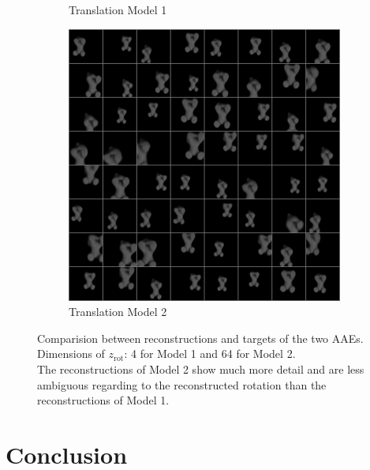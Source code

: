 \documentclass[10pt,a4paper]{article}
\newcommand{\rot}{\ensuremath{\text{rot}\xspace}}
\begin{document}
\begin{figure}[!ht]
\begin{subfigure}{0.3\textwidth}
	\caption{Translation Model 1}
	\label{cat_trec}
\end{subfigure}
\begin{subfigure}{0.3\textwidth}
	\centering	
	\includegraphics[width=\textwidth]{cat_64_output1.png}
	\caption{Translation Model 2}
	\label{cat_trec1}
\end{subfigure}
\caption{Comparision between reconstructions and targets of the two AAEs. 
Dimensions of $z_{\rot}$: 4 for Model 1 and 64 for Model 2.\\
The reconstructions of Model 2 show much more detail and are less ambiguous regarding to the reconstructed rotation than the reconstructions of Model 1.} \label{cat_images}
\end{figure}

\newpage
\section{Conclusion}
\end{document}

